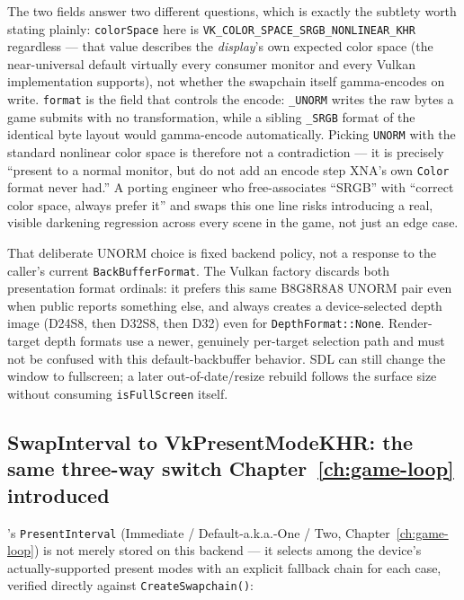 The two fields answer two different questions, which is exactly the subtlety worth stating
plainly: \texttt{colorSpace} here is \texttt{VK\_COLOR\_SPACE\_SRGB\_NONLINEAR\_KHR} regardless
--- that value describes the \emph{display}'s own expected color space (the near-universal
default virtually every consumer monitor and every Vulkan implementation supports), not
whether the swapchain itself gamma-encodes on write. \texttt{format} is the field that
controls the encode: \texttt{\_UNORM} writes the raw bytes a game submits with no
transformation, while a sibling \texttt{\_SRGB} format of the identical byte layout would
gamma-encode automatically. Picking \texttt{UNORM} with the standard nonlinear color space is
therefore not a contradiction --- it is precisely ``present to a normal monitor, but do not
add an encode step XNA's own \texttt{Color} format never had.'' A porting engineer who
free-associates ``SRGB'' with ``correct color space, always prefer it'' and swaps this one
line risks introducing a real, visible darkening regression across every scene in the game,
not just an edge case.

\begin{sourcenote}
That deliberate UNORM choice is fixed backend policy, not a response to the caller's current
\texttt{BackBufferFormat}. The Vulkan factory discards both presentation format ordinals:
it prefers this same B8G8R8A8 UNORM pair even when public
 reports something else, and always creates a
device-selected depth image (D24S8, then D32S8, then D32) even for
\texttt{DepthFormat::None}. Render-target depth formats use a newer, genuinely per-target
selection path and must not be confused with this default-backbuffer behavior. SDL can still
change the window to fullscreen; a later out-of-date/resize rebuild follows the surface size
without consuming \texttt{isFullScreen} itself.
\end{sourcenote}

\subsection{SwapInterval to VkPresentModeKHR: the same three-way switch Chapter~\ref{ch:game-loop} introduced}

's \texttt{PresentInterval} (Immediate / Default-a.k.a.-One / Two,
Chapter~\ref{ch:game-loop}) is not merely stored on this backend --- it selects among the
device's actually-supported present modes with an explicit fallback chain for each case,
verified directly against \texttt{CreateSwapchain()}:

